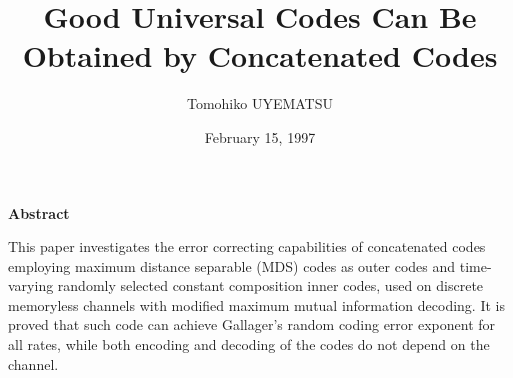 \documentclass[12pt]{report}
\title{%
Good Universal Codes Can Be Obtained by Concatenated Codes}
\author{Tomohiko UYEMATSU}
\date{February 15, 1997}
\begin{document}
\maketitle

\setcounter{page}{1}

\strut
\vspace{20pt}

\begin{center}
{\LARGE\bf Abstract}
\end{center}
\vspace{20pt}

This paper investigates the error 
correcting capabilities of concatenated codes 
employing maximum distance separable (MDS) codes as outer codes and
time-varying randomly selected constant composition inner codes,
used on discrete memoryless channels with modified maximum mutual 
information decoding. It is proved that such code
can achieve Gallager's random coding error exponent
for all rates, while both encoding and decoding of the codes do not
depend on the channel. 



\tableofcontents
\newpage
{}
\setcounter{page}{1}







\end{document}
